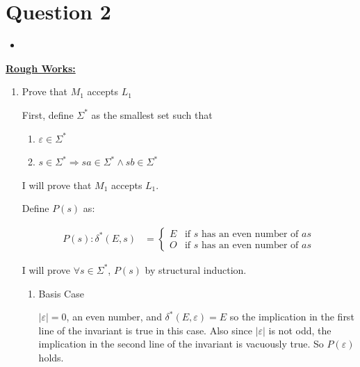 \documentclass[12pt]{article}
\begin{document}
\bigskip

\section*{Question 2}

\bigskip

\begin{itemize}
    \item

\end{itemize}

\bigskip

\underline{\textbf{Rough Works:}}

\bigskip

\begin{enumerate}[1.]
    \item Prove that $M_1$ accepts $L_1$

    \begin{mdframed}
    First, define $\Sigma^*$ as the smallest set such that
    \begin{enumerate}
        \item $\varepsilon \in \Sigma^*$
        \item $s \in \Sigma^* \Rightarrow sa \in \Sigma^* \land sb \in \Sigma^*$
    \end{enumerate}

    \bigskip

    I will prove that $M_1$ accepts $L_1$.

    \bigskip

    Define $P(s)$ as:

    \begin{align}
        P(s):\delta^*(E,s) &= \begin{cases}
            E & \text{if $s$ has an even number of $as$}\\
            O & \text{if $s$ has an even number of $as$}
        \end{cases}
    \end{align}

    I will prove $\forall s \in \Sigma^*$, $P(s)$ by structural induction.

    \begin{enumerate}[1.]
        \item Basis Case

        \bigskip

        $\vert \varepsilon \vert = 0$, an even number, and $\delta^*(E,\varepsilon) = E$
        so the implication in the first line of the invariant is true in this case.
        Also since $\vert \varepsilon \vert$ is not odd, the implication in the second
        line of the invariant is vacuously true. So $P(\varepsilon)$ holds.


\end{enumerate}
\end{mdframed}
\end{enumerate}
\end{document}
